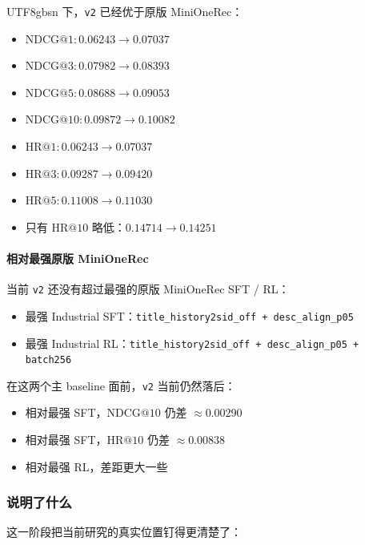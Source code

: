 \documentclass[11pt]{article}
\begin{document}
\begin{CJK*}{UTF8}{gbsn}
下，\texttt{v2} 已经优于原版 MiniOneRec：

\begin{itemize}
  \item \(\mathrm{NDCG}@1: 0.06243 \rightarrow 0.07037\)
  \item \(\mathrm{NDCG}@3: 0.07982 \rightarrow 0.08393\)
  \item \(\mathrm{NDCG}@5: 0.08688 \rightarrow 0.09053\)
  \item \(\mathrm{NDCG}@10: 0.09872 \rightarrow 0.10082\)
  \item \(\mathrm{HR}@1: 0.06243 \rightarrow 0.07037\)
  \item \(\mathrm{HR}@3: 0.09287 \rightarrow 0.09420\)
  \item \(\mathrm{HR}@5: 0.11008 \rightarrow 0.11030\)
  \item 只有 \(\mathrm{HR}@10\) 略低：\(0.14714 \rightarrow 0.14251\)
\end{itemize}

\paragraph{相对最强原版 MiniOneRec}

当前 \texttt{v2} 还没有超过最强的原版 MiniOneRec SFT / RL：

\begin{itemize}
  \item 最强 Industrial SFT：\texttt{title\_history2sid\_off + desc\_align\_p05}
  \item 最强 Industrial RL：\texttt{title\_history2sid\_off + desc\_align\_p05 + batch256}
\end{itemize}

在这两个主 baseline 面前，\texttt{v2} 当前仍然落后：

\begin{itemize}
  \item 相对最强 SFT，\(\mathrm{NDCG}@10\) 仍差 \(\approx 0.00290\)
  \item 相对最强 SFT，\(\mathrm{HR}@10\) 仍差 \(\approx 0.00838\)
  \item 相对最强 RL，差距更大一些
\end{itemize}

\subsubsection*{说明了什么}

这一阶段把当前研究的真实位置钉得更清楚了：


\end{CJK*}
\end{document}
